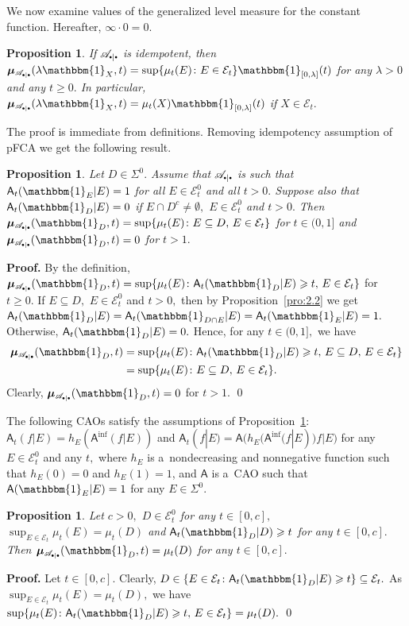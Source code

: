 \documentclass[preprint,11pt]{elsarticle}
\newtheorem{proposition}[tw]{Proposition}
\theoremstyle{definition}
\renewenvironment{proof}[1][\textbf{Proof}]{\noindent\textbf{#1.} }{\hfill\qed\vspace{2.5ex}}
\newcommand\cE{{\mathcal E}}
\newcommand\sA{\mathsf{A}}
\newcommand\aAd[3][E]{\sA_{#3}(#2|#1)}%
\newcommand\sbullet[1][.5]{\mathbin{\vcenter{\hbox{\scalebox{#1}{$\bullet$}}}}}
\newcommand\bpeA{\mathscr {A}_{\sbullet|\sbullet}}%
\newcommand{\bmu}{\boldsymbol{\mu}}
\newcommand\bmub[1][\bpeA]{\bmu_{#1}}
\renewcommand\ge{\geqslant}
\newcommand{\mI}[1]{\mathbbm{1}_{#1}}%
\newcommand{\tx}{\textstyle{}}
\begin{document}
We now examine values of the generalized level measure for the constant function. Hereafter, $\infty\cdot 0=0.$

\begin{proposition}
If  $\bpeA$ is idempotent, then
$\bmub(\lambda\mI{X},t)=\sup\{\mu_t(E)\colon E\in \cE_t\}\mI{[0,\lambda]}(t)$ for any $\lambda>0$ and any $t\ge 0.$ In particular, $\bmub(\lambda\mI{X},t)=\mu_t(X)\mI{[0,\lambda]}(t)$ if $X\in\cE_t.$
\end{proposition}

The proof is immediate from definitions. Removing idempotency assumption of pFCA we get the following result.

\begin{proposition}\label{pro:4.13}
Let $D\in \Sigma^0.$
Assume that $\bpeA$ is such that $\aAd{\mI{E}}{t}=1$ for all $E\in\cE_t^0$ and all $t>0.$
Suppose also that
$\aAd{\mI{D}}{t}=0$ if $E\cap D^c\neq \emptyset,$
$E\in\cE_t^0$ and $t>0.$
Then  $\bmub(\mI{D},t)=\sup\{\mu_t(E)\colon E\subseteq D,\, E\in \cE_t\}$
for $t\in (0,1]$ and $\bmub(\mI{D},t)=0$ for $t>1.$
\end{proposition}
\begin{proof}
By the definition, $\bmub(\mI{D},t)=\sup\{\mu_t(E)\colon \aAd{\mI{D}}{t}\ge t,\,E\in\cE_t\}$ for $t\ge 0.$
If $E\subseteq D,$   $E\in\cE_t^0$ and $t>0,$ then by Proposition~\ref{pro:2.2} we get $\aAd{\mI{D}}{t}=\aAd{\mI{D\cap E}}{t}=\aAd{\mI{E}}{t}=1.$
Otherwise, $\aAd{\mI{D}}{t}=0.$
Hence, for any $t\in (0,1],$ we have
 \begin{align*}
     \bmub(\mI{D},t)&=\sup\{\mu_t(E)\colon \sA_t(\mI{D}|E)\ge t,\,E\subseteq D,\,E\in\cE_t\}
     \\&   =\sup\{\mu_t(E)\colon E\subseteq D,\,E\in\cE_t\}.
\end{align*}
Clearly, $\bmub(\mI{D},t)=0$ for $t>1.$
\end{proof}


The following  CAOs satisfy the assumptions of Proposition~\ref{pro:4.13}: $\sA_t(f|E)=\tx{h_E(\sA^{\inf}(f|E))}$ and $\sA_t(f|E)=\sA\big(h_E(\sA^{\inf}(f|E))f|E\big)$ for any $E\in\cE^0_t$ and any $t,$ where $h_E$ is a~nondecreasing and nonnegative function such that $h_E(0)=0$ and $h_E(1)=1$, and $\sA$ is a~CAO such that $\sA(\mI{E}|E)=1$ for any $E\in \Sigma^0.$

\begin{proposition}\label{pro:4.14159}
Let $c>0,$  $D\in \cE_t^0$ for any $t\in [0,c],$  $\tx{\sup_{E\in\cE_t} \mu_t(E)}=\mu_t(D)$  and $\aAd[D]{\mI{D}}{t}\ge t$  for any $t\in [0,c].$
Then $\bmub(\mI{D},t)=\mu_t(D)$ for any $t\in [0, c].$
\end{proposition}
\begin{proof}
Let $t\in [0,c].$ Clearly,  $D\in \{E\in \cE_t\colon \sA_t(\mI{D}|E)\ge t\}\subseteq \cE_t.$ As $\tx{\sup_{E\in\cE_t} \mu_t(E)=\mu_t(D)},$ we have
$\tx{\sup \{\mu_t(E)\colon \sA_t(\mI{D}|E)\ge t,\,E\in \cE_t\} =\mu_t(D)}.$
\end{proof}
\end{document}
